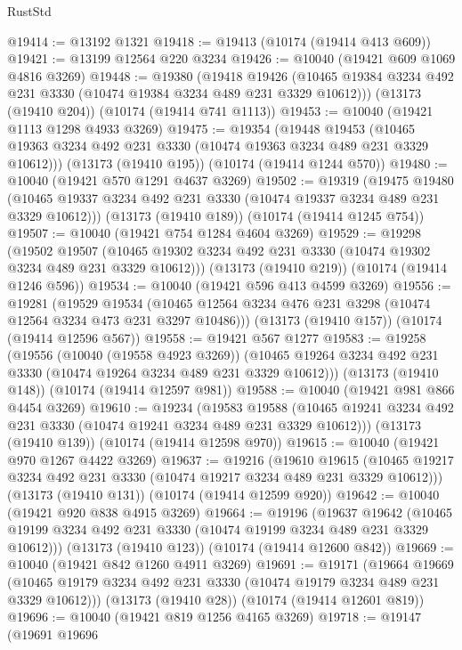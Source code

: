 \begin{lexlean}{RustStd}
\begin{coremodule}
@19414 := @13192 @1321
@19418 := @19413 (@10174 (@19414 @413 @609))
@19421 := @13199 @12564 @220 @3234
@19426 := @10040 (@19421 @609 @1069 @4816 @3269)
@19448 := @19380
    (@19418
      @19426
      (@10465 @19384 @3234 @492 @231 @3330 (@10474 @19384 @3234 @489 @231 @3329 @10612)))
    (@13173 (@19410 @204))
    (@10174 (@19414 @741 @1113))
@19453 := @10040 (@19421 @1113 @1298 @4933 @3269)
@19475 := @19354
    (@19448
      @19453
      (@10465 @19363 @3234 @492 @231 @3330 (@10474 @19363 @3234 @489 @231 @3329 @10612)))
    (@13173 (@19410 @195))
    (@10174 (@19414 @1244 @570))
@19480 := @10040 (@19421 @570 @1291 @4637 @3269)
@19502 := @19319
    (@19475
      @19480
      (@10465 @19337 @3234 @492 @231 @3330 (@10474 @19337 @3234 @489 @231 @3329 @10612)))
    (@13173 (@19410 @189))
    (@10174 (@19414 @1245 @754))
@19507 := @10040 (@19421 @754 @1284 @4604 @3269)
@19529 := @19298
    (@19502
      @19507
      (@10465 @19302 @3234 @492 @231 @3330 (@10474 @19302 @3234 @489 @231 @3329 @10612)))
    (@13173 (@19410 @219))
    (@10174 (@19414 @1246 @596))
@19534 := @10040 (@19421 @596 @413 @4599 @3269)
@19556 := @19281
    (@19529
      @19534
      (@10465 @12564 @3234 @476 @231 @3298 (@10474 @12564 @3234 @473 @231 @3297 @10486)))
    (@13173 (@19410 @157))
    (@10174 (@19414 @12596 @567))
@19558 := @19421 @567 @1277
@19583 := @19258
    (@19556
      (@10040 (@19558 @4923 @3269))
      (@10465 @19264 @3234 @492 @231 @3330 (@10474 @19264 @3234 @489 @231 @3329 @10612)))
    (@13173 (@19410 @148))
    (@10174 (@19414 @12597 @981))
@19588 := @10040 (@19421 @981 @866 @4454 @3269)
@19610 := @19234
    (@19583
      @19588
      (@10465 @19241 @3234 @492 @231 @3330 (@10474 @19241 @3234 @489 @231 @3329 @10612)))
    (@13173 (@19410 @139))
    (@10174 (@19414 @12598 @970))
@19615 := @10040 (@19421 @970 @1267 @4422 @3269)
@19637 := @19216
    (@19610
      @19615
      (@10465 @19217 @3234 @492 @231 @3330 (@10474 @19217 @3234 @489 @231 @3329 @10612)))
    (@13173 (@19410 @131))
    (@10174 (@19414 @12599 @920))
@19642 := @10040 (@19421 @920 @838 @4915 @3269)
@19664 := @19196
    (@19637
      @19642
      (@10465 @19199 @3234 @492 @231 @3330 (@10474 @19199 @3234 @489 @231 @3329 @10612)))
    (@13173 (@19410 @123))
    (@10174 (@19414 @12600 @842))
@19669 := @10040 (@19421 @842 @1260 @4911 @3269)
@19691 := @19171
    (@19664
      @19669
      (@10465 @19179 @3234 @492 @231 @3330 (@10474 @19179 @3234 @489 @231 @3329 @10612)))
    (@13173 (@19410 @28))
    (@10174 (@19414 @12601 @819))
@19696 := @10040 (@19421 @819 @1256 @4165 @3269)
@19718 := @19147
    (@19691
      @19696

\end{coremodule}
\end{lexlean}
